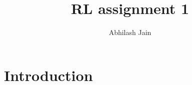 \documentclass{article}
\title{RL assignment 1}
\author{Abhilash Jain}
\begin{document}
\maketitle
\section{Introduction}
\end{document}
